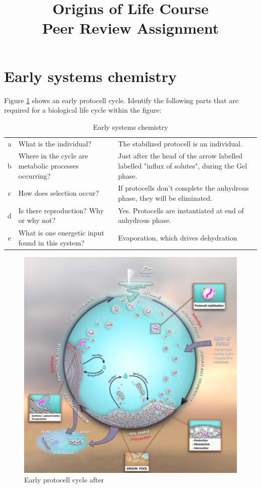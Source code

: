 \documentclass[]{article}
\title{
	Origins of Life Course\\
	Peer Review Assignment
}
\begin{document}
\maketitle

\tableofcontents
\listoffigures

\section{Early systems chemistry}

Figure \ref{fig:damer} shows an early protocell cycle. Identify the following parts that are
required for a biological life cycle within the figure:
\begin{table}[H]
	\caption{Early systems chemistry}	{
	\begin{tabular}{|c|p{3cm}|p{8cm}|}\hline
	a&	What is the individual? &The stabilized protocell is an individual.\\
	b&	Where in the cycle are metabolic processes occurring? &Just after the head of the arrow labelled labelled "influx of solutes", during the Gel phase.\\
	c&	How does selection occur?&If protocells don't complete the anhydrous phase, they will be eliminated. \\
	d&	Is there reproduction? Why or why not? &Yes. Protocells are instantiated at end of anhydrous phase.\\
	e&	What is one energetic input found in this system?&Evaporation, which drives dehydration\cite{damer2016field}\\\hline
	\end{tabular}}
\end{table}

\begin{figure}[H]
	\caption[Early protocell cycle]{Early protocell cycle after \cite{damer2016field}}\label{fig:damer}
	\includegraphics[width=\textwidth]{WarmLittlePond}
\end{figure}
\end{document}
